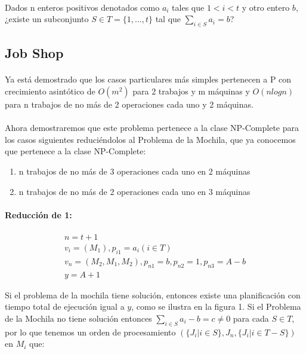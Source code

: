 \documentclass[11pt, a4paper,spanish]{article}
\begin{document}
				\paragraph{}
				Dados n enteros positivos denotados como $a_{i}$ tales que $1 < i < t$ y otro entero $b$, ¿existe un subconjunto $S \in T = \{1,...,t\} $ tal que $\sum_{i\in S}a_{i}= b$?
				
				
				
			\subsection{Job Shop}
			
				\paragraph{}
				 Ya está demostrado que los casos particulares más simples pertenecen a P con crecimiento asintótico de $O(m^2)$ para 2 trabajos y m máquinas y $O(n logn)$ para n trabajos de no más de 2 operaciones cada uno y 2 máquinas. 
				 
				\paragraph{}
				 Ahora demostraremos que este problema pertenece a la clase NP-Complete para los casos siguientes reduciéndolos al Problema de la Mochila, que ya conocemos que pertenece a la clase NP-Complete:
				 \begin{enumerate}
				  	\item n trabajos de no más de 3 operaciones cada uno en 2 máquinas
				 	\item n trabajos de no más de 2 operaciones cada uno en 3 máquinas
				 \end {enumerate}

				\paragraph{Reducción de 1:}
				
					\begin{gather}
						n = t+1 \\
						v_{i} = (M_{1}), p_{i1} = a_{i} (i \in T) \\
						v_{n} = (M_{2}, M_{1}, M_{2}), p_{n1} = b,  p_{n2} = 1,  p_{n3} = A-b \\
						y = A +1
					\end{gather}
			
					Si el problema de la mochila tiene solución, entonces existe una planificación con tiempo total de ejecución igual a $y$, como se ilustra en la figura 1. Si el Problema de la Mochila no tiene solución entonces  $\sum_{i\in S}a_{i} - b = c \neq 0$ para cada  $S \in T$, por lo que tenemos un orden de procesamiento $( \{J_{i} | i \in S\},J_{n} , \{J_{i} | i \in T-S\})$ en $M_{i}$ que:
\end{document}
